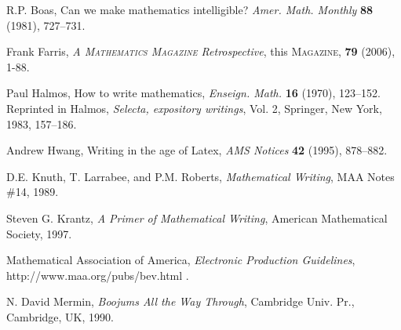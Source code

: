 \documentclass[12pt]{article}
\begin{document}
\begin{thebibliography}{20}

  R.P. Boas, Can we make mathematics intelligible? \textit{Amer. Math.
Monthly} \textbf{88} (1981), 727--731.

  Frank Farris, \textit{A \textsc{Mathematics Magazine} Retrospective}, this \textsc{Magazine}, \textbf{79} (2006), 1-88.

 Paul Halmos, How to write mathematics,
\textit{Enseign.  Math.} \textbf{16} (1970), 123--152.  Reprinted in
Halmos, \textit{Selecta, expository writings}, Vol.  2, Springer, New
York, 1983, 157--186.

 Andrew Hwang, Writing in the age of Latex, \textit{AMS
Notices} \textbf{42} (1995), 878--882.

  D.E. Knuth, T. Larrabee, and P.M. Roberts,
\textit{Mathematical Writing}, MAA Notes \#14, 1989.

   Steven G. Krantz, \textit{A Primer of Mathematical Writing},
American Mathematical Society, 1997.

 Mathematical Association of America, \textit{Electronic
Production Guidelines}, http://www.maa.org/pubs/bev.html .

 N. David Mermin, \textit{Boojums All the Way
Through}, Cambridge Univ.  Pr., Cambridge, UK, 1990.

\end{thebibliography}
\end{document}
